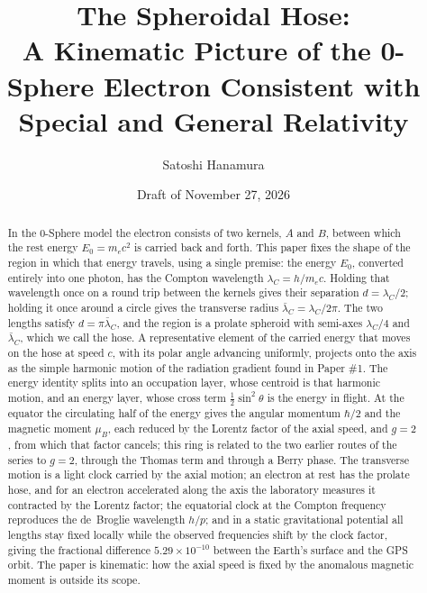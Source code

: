 \documentclass[%
 reprint, amsmath,amssymb, aps, prb, ]{revtex4-2}
\numberwithin{equation}{section}
\newcommand{\lamC}{\lambda_C}
\newcommand{\lbar}{\bar{\lambda}_C}
\begin{document}
\title{The Spheroidal Hose:\\A Kinematic Picture of the 0-Sphere Electron Consistent with Special and General Relativity}

\author{Satoshi Hanamura}

\date{Draft of November 27, 2026}

\begin{abstract}
In the 0-Sphere model the electron consists of two kernels, $A$ and $B$, between which the rest energy $E_0 = m_ec^2$ is carried back and forth.
This paper fixes the shape of the region in which that energy travels, using a single premise: the energy $E_0$, converted entirely into one photon, has the Compton wavelength $\lamC = h/m_ec$.
Holding that wavelength once on a round trip between the kernels gives their separation $d = \lamC/2$; holding it once around a circle gives the transverse radius $\lbar = \lamC/2\pi$.
The two lengths satisfy $d = \pi\lbar$, and the region is a prolate spheroid with semi-axes $\lamC/4$ and $\lbar$, which we call the hose.
A representative element of the carried energy that moves on the hose at speed $c$, with its polar angle advancing uniformly, projects onto the axis as the simple harmonic motion of the radiation gradient found in Paper \#1.
The energy identity splits into an occupation layer, whose centroid is that harmonic motion, and an energy layer, whose cross term $\tfrac12\sin^2\theta$ is the energy in flight.
At the equator the circulating half of the energy gives the angular momentum $\hbar/2$ and the magnetic moment $\mu_B$, each reduced by the Lorentz factor of the axial speed, and $g = 2$, from which that factor cancels; this ring is related to the two earlier routes of the series to $g = 2$, through the Thomas term and through a Berry phase.
The transverse motion is a light clock carried by the axial motion; an electron at rest has the prolate hose, and for an electron accelerated along the axis the laboratory measures it contracted by the Lorentz factor; the equatorial clock at the Compton frequency reproduces the de~Broglie wavelength $h/p$; and in a static gravitational potential all lengths stay fixed locally while the observed frequencies shift by the clock factor, giving the fractional difference $5.29\times10^{-10}$ between the Earth's surface and the GPS orbit.
The paper is kinematic: how the axial speed is fixed by the anomalous magnetic moment is outside its scope.
\end{abstract}
\end{document}
